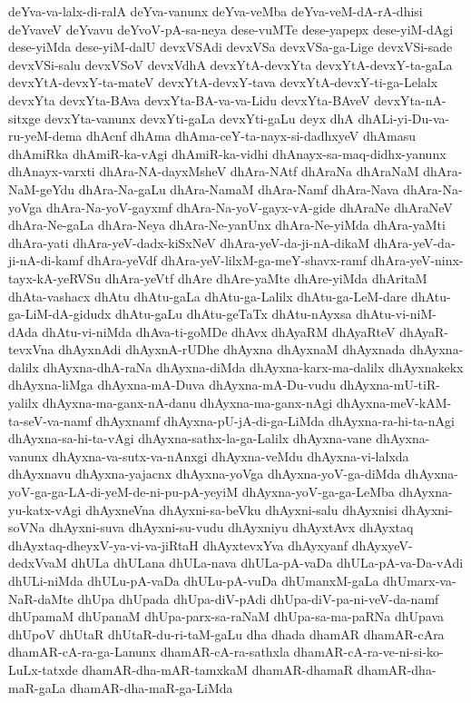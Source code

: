 {deYva-va-lalx-di-ralA
deYva-vanunx
deYva-veMba
deYva-veM-dA-rA-dhisi
deYvaveV
deYvavu
deYvoV-pA-sa-neya
dese-vuMTe
dese-yapepx
dese-yiM-dAgi
dese-yiMda
dese-yiM-dalU
devxVSAdi
devxVSa
devxVSa-ga-Lige
devxVSi-sade
devxVSi-salu
devxVSoV
devxVdhA
devxYtA-devxYta
devxYtA-devxY-ta-gaLa
devxYtA-devxY-ta-mateV
devxYtA-devxY-tava
devxYtA-devxY-ti-ga-Lelalx
devxYta
devxYta-BAva
devxYta-BA-va-va-Lidu
devxYta-BAveV
devxYta-nA-sitxge
devxYta-vanunx
devxYti-gaLa
devxYti-gaLu
deyx
dhA
dhALi-yi-Du-va-ru-yeM-dema
dhAcnf
dhAma
dhAma-ceY-ta-nayx-si-dadhxyeV
dhAmasu
dhAmiRka
dhAmiR-ka-vAgi
dhAmiR-ka-vidhi
dhAnayx-sa-maq-didhx-yanunx
dhAnayx-varxti
dhAra-NA-dayxMsheV
dhAra-NAtf
dhAraNa
dhAraNaM
dhAra-NaM-geYdu
dhAra-Na-gaLu
dhAra-NamaM
dhAra-Namf
dhAra-Nava
dhAra-Na-yoVga
dhAra-Na-yoV-gayxmf
dhAra-Na-yoV-gayx-vA-gide
dhAraNe
dhAraNeV
dhAra-Ne-gaLa
dhAra-Neya
dhAra-Ne-yanUnx
dhAra-Ne-yiMda
dhAra-yaMti
dhAra-yati
dhAra-yeV-dadx-kiSxNeV
dhAra-yeV-da-ji-nA-dikaM
dhAra-yeV-da-ji-nA-di-kamf
dhAra-yeVdf
dhAra-yeV-lilxM-ga-meY-shavx-ramf
dhAra-yeV-ninx-tayx-kA-yeRVSu
dhAra-yeVtf
dhAre
dhAre-yaMte
dhAre-yiMda
dhAritaM
dhAta-vashacx
dhAtu
dhAtu-gaLa
dhAtu-ga-Lalilx
dhAtu-ga-LeM-dare
dhAtu-ga-LiM-dA-gidudx
dhAtu-gaLu
dhAtu-geTaTx
dhAtu-nAyxsa
dhAtu-vi-niM-dAda
dhAtu-vi-niMda
dhAva-ti-goMDe
dhAvx
dhAyaRM
dhAyaRteV
dhAyaR-tevxVna
dhAyxnAdi
dhAyxnA-rUDhe
dhAyxna
dhAyxnaM
dhAyxnada
dhAyxna-dalilx
dhAyxna-dhA-raNa
dhAyxna-diMda
dhAyxna-karx-ma-dalilx
dhAyxnakekx
dhAyxna-liMga
dhAyxna-mA-Duva
dhAyxna-mA-Du-vudu
dhAyxna-mU-tiR-yalilx
dhAyxna-ma-ganx-nA-danu
dhAyxna-ma-ganx-nAgi
dhAyxna-meV-kAM-ta-seV-va-namf
dhAyxnamf
dhAyxna-pU-jA-di-ga-LiMda
dhAyxna-ra-hi-ta-nAgi
dhAyxna-sa-hi-ta-vAgi
dhAyxna-sathx-la-ga-Lalilx
dhAyxna-vane
dhAyxna-vanunx
dhAyxna-va-sutx-va-nAnxgi
dhAyxna-veMdu
dhAyxna-vi-lalxda
dhAyxnavu
dhAyxna-yajacnx
dhAyxna-yoVga
dhAyxna-yoV-ga-diMda
dhAyxna-yoV-ga-ga-LA-di-yeM-de-ni-pu-pA-yeyiM
dhAyxna-yoV-ga-ga-LeMba
dhAyxna-yu-katx-vAgi
dhAyxneVna
dhAyxni-sa-beVku
dhAyxni-salu
dhAyxnisi
dhAyxni-soVNa
dhAyxni-suva
dhAyxni-su-vudu
dhAyxniyu
dhAyxtAvx
dhAyxtaq
dhAyxtaq-dheyxV-ya-vi-va-jiRtaH
dhAyxtevxYva
dhAyxyanf
dhAyxyeV-dedxVvaM
dhULa
dhULana
dhULa-nava
dhULa-pA-vaDa
dhULa-pA-va-Da-vAdi
dhULi-niMda
dhULu-pA-vaDa
dhULu-pA-vuDa
dhUmanxM-gaLa
dhUmarx-va-NaR-daMte
dhUpa
dhUpada
dhUpa-diV-pAdi
dhUpa-diV-pa-ni-veV-da-namf
dhUpamaM
dhUpanaM
dhUpa-parx-sa-raNaM
dhUpa-sa-ma-paRNa
dhUpava
dhUpoV
dhUtaR
dhUtaR-du-ri-taM-gaLu
dha
dhada
dhamAR
dhamAR-cAra
dhamAR-cA-ra-ga-Lanunx
dhamAR-cA-ra-sathxla
dhamAR-cA-ra-ve-ni-si-ko-LuLx-tatxde
dhamAR-dha-mAR-tamxkaM
dhamAR-dhamaR
dhamAR-dha-maR-gaLa
dhamAR-dha-maR-ga-LiMda
}
